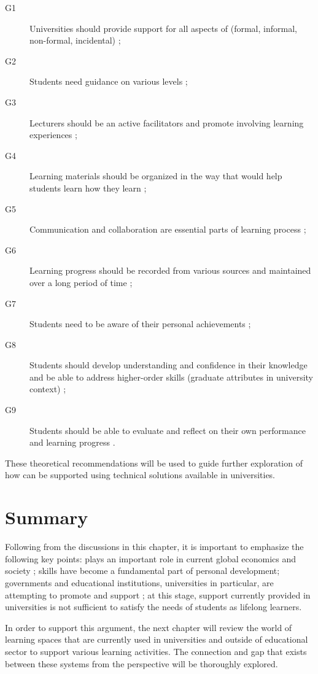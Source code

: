 \begin{description}
  \item[G1] Universities should provide support for all aspects of \LLLs
  (formal, informal, non-formal, incidental) \citep{Smidt2011};
  \item[G2] Students need guidance on various levels \citep{Leone2019};
  \item[G3] Lecturers should be an active facilitators and promote involving
  learning experiences \citep{Leone2019}; 
  \item[G4] Learning materials should be organized in the way that would help
students learn how they learn \citep{Medel-Anonuevo2001};
  \item[G5] Communication and collaboration are essential parts of learning
  process \citep{Schaffert2008};
  \item[G6] Learning progress should be recorded from various sources and
  maintained over a long period of time \citep{Kay2008};
  \item[G7] Students need to be aware of their personal achievements
\citep{Schuetze2006};
  \item[G8] Students should develop understanding and confidence in their
  knowledge and be able to address higher-order skills (graduate attributes in university
  context) \citep{Hart1999};
  \item[G9] Students should be able to evaluate and reflect on their own
  performance and learning progress \citep{Mourtos2003}.
\end{description} 

These theoretical recommendations will be used to guide further exploration of
 how \LLLs can be supported using technical solutions available in universities.

\section{Summary} 

Following from the discussions in this chapter, it is important to emphasize
the following key points: \LLLs plays an important role in current global
economics and society
\citep{Jarvis2008,Simmons-McDonald2009,InternationalLabourOffice2008}; \LLLs
skills have become a fundamental part of personal development; governments and
educational institutions, universities in particular, are attempting to promote
and support \LLLsn; at this stage, \LLLs support currently provided in
universities is not sufficient to satisfy the needs of students as lifelong
learners.

In order to support this argument, the next chapter will review the world of
learning spaces that are currently used in universities and outside of
educational sector to support various learning activities. The connection and
gap that exists between these systems from the \LLLs perspective will be
thoroughly explored.
